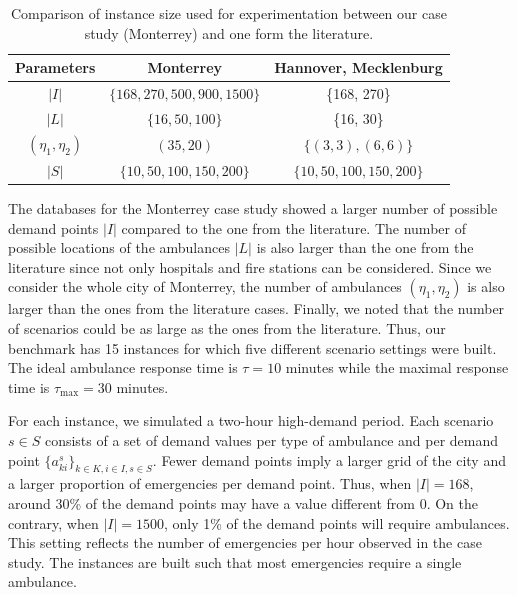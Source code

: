 \begin{table}[htb]
    \centering
    \begin{tabular}{ccc}
    \hline
       Parameters  &  Monterrey & Hannover, Mecklenburg \cite{yoon2021stochastic} \\
       \hline
       $|I|$  & $\{168, 270, 500, 900, 1500\}$ & \{168, 270\} \\
        $|L|$  & $ \{16,50,100\}$ & \{16, 30\} \\
        $(\eta_1,\eta_2)$ & $ (35,20) $ & $\{(3,3), (6,6)\}$\\
       $|S|$   & $ \{10,50,100, 150, 200\}$  &   $ \{ 10, 50, 100, 150, 200\}$\\
       \hline 
    \end{tabular}
    \caption{Comparison of instance size used for experimentation between our case study (Monterrey) and one form the literature.}
    \label{tab:yoon_p}
\end{table}
The databases for the Monterrey case study showed a larger number of possible demand points $|I|$ compared to the one from the literature. The number of possible locations of the ambulances $|L|$ is also larger than the one from the literature since not only hospitals and fire stations can be considered. Since we consider the whole city of Monterrey, the number of ambulances $(\eta_1,\eta_2)$ is also larger than the ones from the literature cases. Finally, we noted that the number of scenarios could be as large as the ones from the literature. Thus, our benchmark has 15 instances for which five different scenario settings were built. The ideal ambulance response time is $\tau = 10$ minutes while the maximal response time is $\tau_{\max}=30$ minutes.  
  
For each instance, we simulated a two-hour high-demand period. Each scenario $s\in S$ consists of a set of demand values per type of ambulance and per demand point $\{a^s_{ki}\}_{k\in K, i\in I,s\in S}$. %
Fewer demand points imply a larger grid of the city and a larger proportion of emergencies per demand point. Thus, when $|I|=168$, around 30\% of the demand points may have a value different from 0. On the contrary, when $|I|=1500$, only 1\% of the demand points will require ambulances. This setting reflects the number of emergencies per hour observed in the case study. The instances are built such that most emergencies require a single ambulance. 
 
